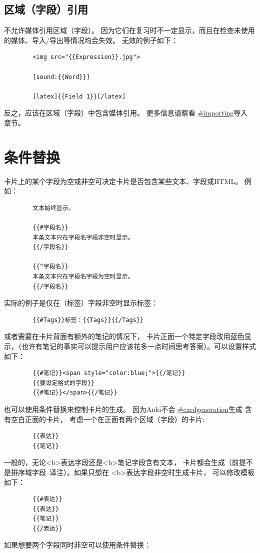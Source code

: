 \documentclass[a4paper]{book}
\newcounter{img}[chapter]
\begin{document}
	\subsection{区域（字段）引用}
	不允许媒体引用区域（字段）。 因为它们在复习时不一定显示，而且在检查未使用的媒体、导入/导出等情况均会失效。 无效的例子如下：
	
	\begin{shaded}\begin{verbatim}
		<img src="{{Expression}}.jpg">
		
		[sound:{{Word}}]
		
		[latex]{{Field 1}}[/latex]
		\end{verbatim}\end{shaded}
	反之，应该在区域（字段）中包含媒体引用。 更多信息请察看 \url{#importing}导入 章节。
	\section{条件替换}
	卡片上的某个字段为空或非空可决定卡片是否包含某些文本、字段或HTML。 例如：
	
	\begin{shaded}\begin{verbatim}
		文本始终显示。
		
		{{#字段名}}
		本条文本只在字段名字段非空时显示。
		{{/字段名}}
		
		{{^字段名}}
		本条文本只在字段名字段为空时显示。
		{{/字段名}}
		\end{verbatim}\end{shaded}
	实际的例子是仅在（标签）字段非空时显示标签：
	\begin{shaded}\begin{verbatim}
		{{#Tags}}标签：{{Tags}}{{/Tags}}
		\end{verbatim}\end{shaded}
	或者需要在卡片背面有额外的笔记的情况下， 卡片正面一个特定字段改用蓝色显示，（也许有笔记的事实可以提示用户应该花多一点时间思考答案）。可以设置样式如下：
	
	\begin{shaded}\begin{verbatim}
		{{#笔记}}<span style="color:blue;">{{/笔记}}
		{{要设定格式的字段}}
		{{#笔记}}</span>{{/笔记}}
		\end{verbatim}\end{shaded}
	也可以使用条件替换来控制卡片的生成。 因为Anki不会 \url{#cardgeneration}生成 含有空白正面的卡片， 考虑一个在正面有两个区域（字段）的卡片:
	
	\begin{shaded}\begin{verbatim}
		{{表达}}
		{{笔记}}
		\end{verbatim}\end{shaded}
	一般的，无论<b>表达字段还是<b>笔记字段含有文本， 卡片都会生成（前提不是排序域字段--译注）。如果只想在
	<b>表达字段非空时生成卡片， 可以修改模板如下：
	\begin{shaded}\begin{verbatim}
		{{#表达}}
		{{表达}}
		{{笔记}}
		{{/表达}}
		\end{verbatim}\end{shaded}
	如果想要两个字段同时非空可以使用条件替换：
	
\end{document}
